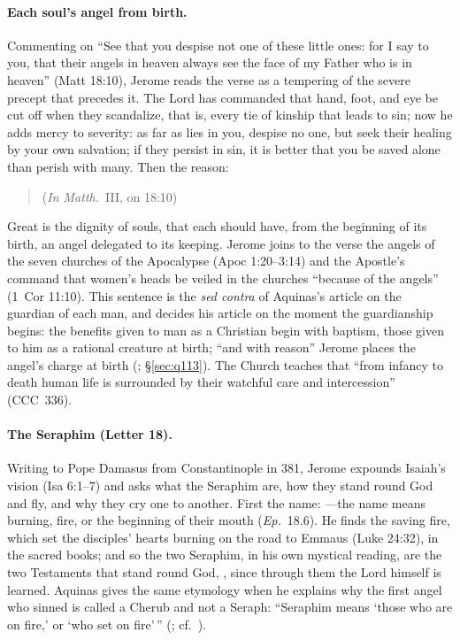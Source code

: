 \paragraph{Each soul's angel from birth.} Commenting on ``See that you
despise not one of these little ones: for I say to you, that their angels
in heaven always see the face of my Father who is in heaven'' (Matt
18:10), Jerome reads the verse as a tempering of the severe precept that
precedes it. The Lord has commanded that hand, foot, and eye be cut off
when they scandalize, that is, every tie of kinship that leads to sin;
now he adds mercy to severity: as far as lies in you, despise no one, but
seek their healing by your own salvation; if they persist in sin, it is
better that you be saved alone than perish with many. Then the reason:
\begin{quote}
 (\emph{In Matth.}\ III, on 18:10)
\end{quote}
\noindent Great is the dignity of souls, that each should have, from the
beginning of its birth, an angel delegated to its keeping. Jerome joins to
the verse the angels of the seven churches of the Apocalypse (Apoc
1:20--3:14) and the Apostle's command that women's heads be veiled in the
churches ``because of the angels'' (1~Cor 11:10). This sentence is the
\emph{sed contra} of Aquinas's article on the guardian of each man, and
decides his article on the moment the guardianship begins: the benefits
given to man as a Christian begin with baptism, those given to him as a
rational creature at birth; ``and with reason'' Jerome places the angel's
charge at birth (; \S\ref{sec:q113}). The Church
teaches that ``from infancy to death human life is surrounded by their
watchful care and intercession'' (CCC~336).

\paragraph{The Seraphim (Letter 18).} Writing to Pope Damasus from
Constantinople in 381, Jerome expounds Isaiah's vision (Isa 6:1--7) and
asks what the Seraphim are, how they stand round God and fly, and why they
cry one to another. First the name: ---the name means burning, fire, or
the beginning of their mouth (\emph{Ep.}\ 18.6). He finds the saving fire, which set the disciples' hearts burning on the
road to Emmaus (Luke 24:32), in the sacred books; and so the two
Seraphim, in his own mystical reading, are the two Testaments that stand
round God,
, since through them the Lord
himself is learned. Aquinas gives the same etymology when he explains why
the first angel who sinned is called a Cherub and not a Seraph: ``Seraphim
means `those who are on fire,' or
`who set on fire'\,'' (; cf.\ ).

